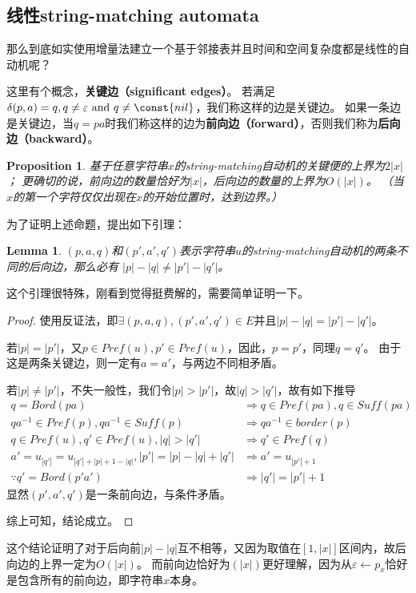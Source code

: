\documentclass[UTF8]{ctexart}
\newtheorem{lem}[thm]{Lemma}
\newtheorem{prop}[thm]{Proposition}
\theoremstyle{definition}
\theoremstyle{remark}
\numberwithin{equation}{subsection}
\newcommand{\Emph}{\textbf}
\newcommand{\Suff}{\textit{Suff}}
\begin{document}
\subsection{线性string-matching automata}
	
	那么到底如实使用增量法建立一个基于邻接表并且时间和空间复杂度都是线性的自动机呢？
	
	这里有个概念，\Emph{关键边（significant edges）}。
	若满足$\delta(p,a)=q, q \neq \varepsilon \text{ and }q \neq \const{nil}$，我们称这样的边是关键边。
	如果一条边是关键边，当$q=pa$时我们称这样的边为\Emph{前向边（forward）}，否则我们称为\Emph{后向边（backward）}。
	
	\begin{prop}
		基于任意字符串$x$的string-matching自动机的关键便的上界为$2|x|$；
		更确切的说，前向边的数量恰好为$|x|$，后向边的数量的上界为$O(|x|)$。
		（当$x$的第一个字符仅仅出现在$x$的开始位置时，达到边界。）
	\end{prop}
	为了证明上述命题，提出如下引理：
	\begin{lem}
		$(p,a,q)$和$(p',a',q')$表示字符串$u$的string-matching自动机的两条不同的后向边，那么必有
		$|p| - |q| \neq |p'| - |q'|$。
	\end{lem}
	这个引理很特殊，刚看到觉得挺费解的，需要简单证明一下。
	\begin{proof}
		使用反证法，即$\exists (p,a,q),(p',a',q') \in E$并且$|p|-|q| = |p'|-|q'|$。
		
		若$|p|=|p'|$，又$p \in Pref(u), p' \in Pref(u)$，因此，$p = p'$，同理$q = q'$。
		由于这是两条关键边，则一定有$a=a'$，与两边不同相矛盾。
		
		若$|p| \neq |p'|$，不失一般性，我们令$|p| > |p'|$，故$|q| > |q'|$，故有如下推导
		\begin{align*}
			q = Bord(pa)	&\Rightarrow q \in Pref(pa), q \in \Suff(pa)	\\
			qa^{-1} \in Pref(p), qa^{-1} \in \Suff(p)	&\Rightarrow qa^{-1} \in border(p)	\\
			q \in Pref(u), q' \in Pref(u), |q|>|q'| &\Rightarrow q' \in Pref(q)	\\
			a' = u_{|q'|} = u_{|q'|+|p|+1-|q|}, |p'|=|p|-|q|+|q'| &\Rightarrow a' = u_{|p'|+1}	\\
			\because q' = Bord(p'a') &\Rightarrow |q'|=|p'|+1
		\end{align*}
		显然$(p',a',q')$是一条前向边，与条件矛盾。
		
		综上可知，结论成立。
	\end{proof}
	这个结论证明了对于后向前$|p|-|q|$互不相等，又因为取值在$[1,|x|]$区间内，故后向边的上界一定为$O(|x|)$。
	而前向边恰好为$(|x|)$更好理解，因为从$\varepsilon \leftarrow p_{x}$恰好是包含所有的前向边，即字符串$x$本身。
	
\end{document}
